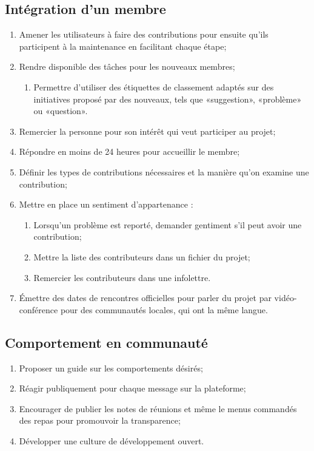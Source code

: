 \subsection{Intégration d’un membre}

\begin{enumerate}
    \item Amener les utilisateurs à faire des contributions pour ensuite qu'ils participent à la maintenance en facilitant chaque étape;
    \item Rendre disponible des tâches pour les nouveaux membres;
    \begin{enumerate}
        \item Permettre d'utiliser des étiquettes de classement adaptés sur des initiatives proposé par des nouveaux, tels que «suggestion», «problème» ou «question».
    \end{enumerate}
    \item Remercier la personne pour son intérêt qui veut participer au projet;
    \item Répondre en moins de 24 heures pour accueillir le membre;
    \item Définir les types de contributions nécessaires et la manière qu'on examine une contribution;
    \item Mettre en place un sentiment d'appartenance :
    \begin{enumerate}
        \item Lorsqu'un problème est reporté, demander gentiment s'il peut avoir une contribution;
        \item Mettre la liste des contributeurs dans un fichier du projet;
        \item Remercier les contributeurs dans une infolettre.
    \end{enumerate}
    \item Émettre des dates de rencontres officielles pour parler du projet par vidéo-conférence pour des communautés locales, qui ont la même langue.
\end{enumerate}

\subsection{Comportement en communauté}

\begin{enumerate}
    \item Proposer un guide sur les comportements désirés;
    \item Réagir publiquement pour chaque message sur la plateforme;
    \item Encourager de publier les notes de réunions et même le menus commandés des repas pour promouvoir la transparence;
    \item Développer une culture de développement ouvert.
\end{enumerate}

